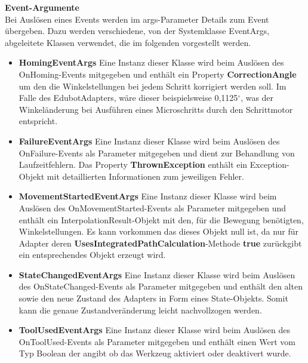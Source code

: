 \textbf{Event-Argumente}\\
Bei Auslösen eines Events werden im args-Parameter Details zum Event übergeben. Dazu werden verschiedene, von der Systemklasse EventArgs, abgeleitete Klassen verwendet, die im folgenden vorgestellt werden.
\begin{itemize}
\item \textbf{HomingEventArgs}
Eine Instanz dieser Klasse wird beim Auslösen des OnHoming-Events mitgegeben und enthält ein Property \textbf{CorrectionAngle} um den die Winkelstellungen bei jedem Schritt korrigiert werden soll. Im Falle des EdubotAdapters, wäre dieser beispielsweise 0,1125$^\circ$, was der Winkeländerung bei Ausführen eines Microschritts durch den Schrittmotor entspricht.
\item \textbf{FailureEventArgs}
Eine Instanz dieser Klasse wird beim Auslösen des OnFailure-Events als Parameter mitgegeben und dient zur Behandlung von Laufzeitfehlern. Das Property \textbf{ThrownException} enthält ein Exception-Objekt mit detaillierten Informationen zum jeweiligen Fehler. 
\item \textbf{MovementStartedEventArgs}
Eine Instanz dieser Klasse wird beim Auslösen des OnMovementStarted-Events als Parameter mitgegeben und enthält ein InterpolationResult-Objekt mit den, für die Bewegung benötigten, Winkelstellungen. Es kann vorkommen das dieses Objekt null ist, da nur für Adapter deren \textbf{UsesIntegratedPathCalculation}-Methode \textbf{true} zurückgibt ein entsprechendes Objekt erzeugt wird. 
\item \textbf{StateChangedEventArgs}
Eine Instanz dieser Klasse wird beim Auslösen des OnStateChanged-Events als Parameter mitgegeben und enthält den alten sowie den neue Zustand des Adapters in Form eines State-Objekts. Somit kann die genaue Zustandveränderung leicht nachvollzogen werden.
\item \textbf{ToolUsedEventArgs}
Eine Instanz dieser Klasse wird beim Auslösen des OnToolUsed-Events als Parameter mitgegeben und enthält einen Wert vom Typ Boolean der angibt ob das Werkzeug aktiviert oder deaktivert wurde.
\end{itemize}

